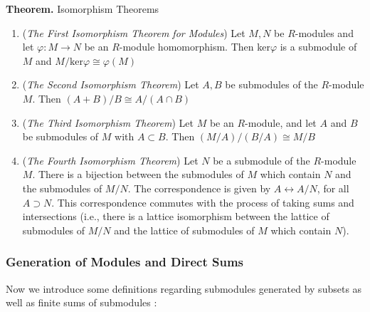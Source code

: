 \documentclass[11pt, reqno]{amsart}
\theoremstyle{plain}
\theoremstyle{definition}
\theoremstyle{example}
\begin{document}
\par
\textbf{Theorem.} Isomorphism Theorems
\begin{enumerate}
\item (\textit{The First Isomorphism Theorem for Modules}) Let $M, N$ be $R$-modules and let $\varphi: M \to N$ be an $R$-module homomorphism. Then ker$\varphi$ is a submodule of $M$ and $M/\text{ker}\varphi \cong \varphi(M)$
\item (\textit{The Second Isomorphism Theorem}) Let $A, B$ be submodules of the $R$-module $M$. Then $(A+B)/B \cong A/(A \cap B)$
\item (\textit{The Third Isomorphism Theorem}) Let $M$ be an $R$-module, and let $A$ and $B$ be submodules of $M$ with $A \subset B$. Then $(M/A)/(B/A) \cong M/B$
\item (\textit{The Fourth Isomorphism Theorem}) Let $N$ be a submodule of the $R$-module $M$. There is a bijection between the submodules of $M$ which contain $N$ and the submodules of $M/N$. The correspondence is given by $A \longleftrightarrow A/N$, for all $A \supset N$. This correspondence commutes with the process of taking sums and intersections (i.e., there is a lattice isomorphism between the lattice of submodules of $M/N$ and the lattice of submodules of $M$ which contain $N$).
\end{enumerate}

\subsubsection{Generation of Modules and Direct Sums}

Now we introduce some definitions regarding submodules generated by subsets as well as finite sums of submodules \cite[\S 10.3, p. 351]{dummit}:
\end{document}
